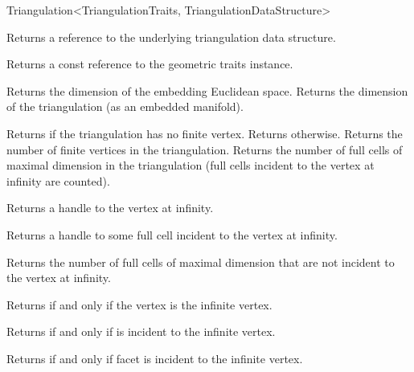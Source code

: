 \begin{ccRefClass}{Triangulation<TriangulationTraits, TriangulationDataStructure>}
\begin{ccAdvanced}
%
{Returns a %
reference to the underlying triangulation data structure.}
\end{ccAdvanced}

%
{Returns a const reference to the geometric traits instance.}

%
{Returns the dimension of the embedding Euclidean space.}
\ccGlue
{}%
{Returns the dimension of the triangulation (as an embedded manifold).}

%
{Returns  if the triangulation has no finite vertex. Returns
 otherwise.}
\ccGlue
{}%
{Returns the number of finite vertices in the triangulation.}
\ccGlue
{}%
{Returns the number of full cells of maximal dimension in the triangulation
(full cells incident to the vertex at infinity are counted).}

%
{Returns a handle to the vertex at infinity.}

%
{Returns a handle to some full cell incident to the vertex at infinity.}


%
{Returns the number of full cells of maximal dimension that are not
  incident to the vertex at infinity.}


{Returns  if and only if the vertex  is the infinite vertex.}

\ccGlue

{Returns  if and only if  is incident to the infinite vertex.
}

\ccGlue

{Returns  if and only if facet  is incident to the infinite
vertex. 
}

\ccGlue


\end{ccRefClass}
